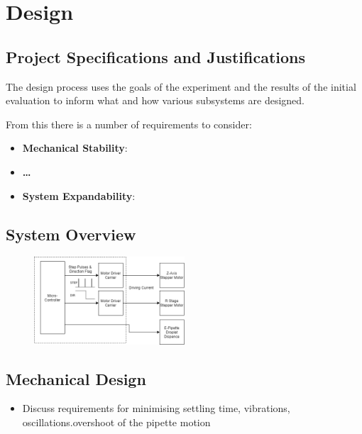 \chapter{Design}\label{C:des}

\section{Project Specifications and Justifications}

The design process uses the goals of the experiment and the results of the initial evaluation to inform what and how various subsystems are designed.

From this there is a number of requirements to consider:

\begin{itemize}
    \item \textbf{Mechanical Stability}:
    \item \textbf{\dots}
    \item \textbf{System Expandability}:
\end{itemize}

\section{System Overview}

\begin{figure}[h]
    \begin{center}
        \includegraphics[width=0.5\textwidth]{img/ED_block_diag.png}
    \end{center}
\end{figure}

\section{Mechanical Design}

\begin{itemize}
    \item Discuss requirements for minimising settling time, vibrations, oscillations.overshoot of the pipette motion 
\end{itemize}

